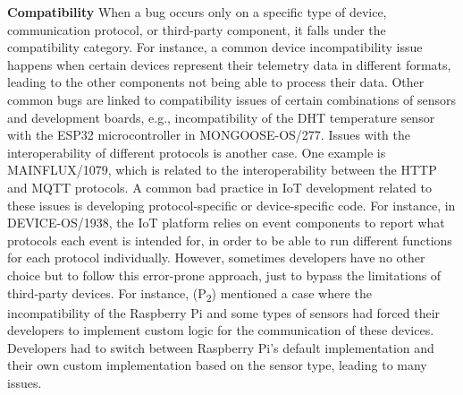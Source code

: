 \textbf{Compatibility}
When a bug occurs only on a specific type of device, communication protocol, or third-party component, it falls under the compatibility category. For instance, a common device incompatibility issue happens when certain devices represent their telemetry data in different formats, leading to the other components not being able to process their data. Other common bugs are linked to compatibility issues of certain combinations of sensors and development boards, e.g., incompatibility of the DHT temperature sensor with the ESP32 microcontroller in MONGOOSE-OS/277. Issues with the interoperability of different protocols is another case. One example is MAINFLUX/1079, which is related to the interoperability between the HTTP and MQTT protocols. A common bad practice in IoT development related to these issues is developing protocol-specific or device-specific code. For instance, in DEVICE-OS/1938, the IoT platform relies on event components to report what protocols each event is intended for, in order to be able to run different functions for each protocol individually. However, sometimes developers have no other choice but to follow this error-prone approach, just to bypass the limitations of third-party devices. For instance, (P\textsubscript{2}) mentioned a case where the incompatibility of the Raspberry Pi and some types of sensors had forced their developers to implement custom logic for the communication of these devices. Developers had to switch between Raspberry Pi's default implementation and their own custom implementation based on the sensor type, leading to many issues.




